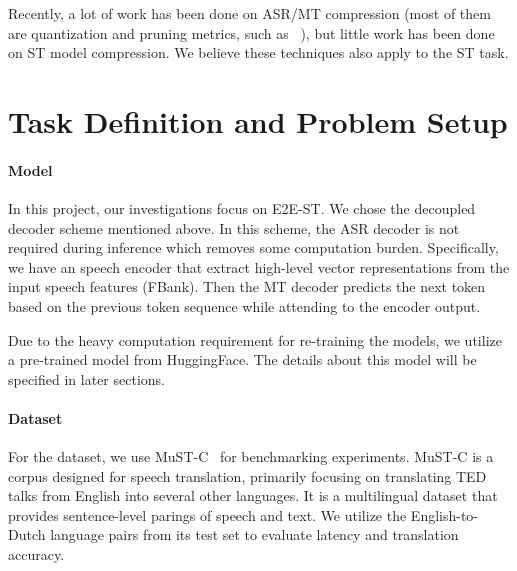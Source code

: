 \documentclass[11pt]{article}
\begin{document}

Recently, a lot of work has been done on ASR/MT compression (most of them are quantization and pruning metrics, such as ~\cite{see2016compression}), but little work has been done on ST model compression. We believe these techniques also apply to the ST task. 




\section{Task Definition and Problem Setup}\label{sec:definition}

\paragraph{Model}
In this project, our investigations focus on E2E-ST. We chose the decoupled decoder scheme mentioned above. In this scheme, the ASR decoder is not required during inference which removes some computation burden.
Specifically, we have an speech encoder that extract high-level vector representations from the input speech features (FBank). Then the MT decoder predicts the next token based on the previous token sequence while attending to the encoder output. 

Due to the heavy computation requirement for re-training the models, we utilize a pre-trained model from HuggingFace. The details about this model will be specified in later sections.


\paragraph{Dataset}
For the dataset, we use MuST-C~\cite{di2019must} for benchmarking experiments. MuST-C is a corpus designed for speech translation, primarily focusing on translating TED talks from English into several other languages. It is a multilingual dataset that provides sentence-level parings of speech and text. We utilize the English-to-Dutch language pairs from its test set to evaluate latency and translation accuracy. 
\end{document}
